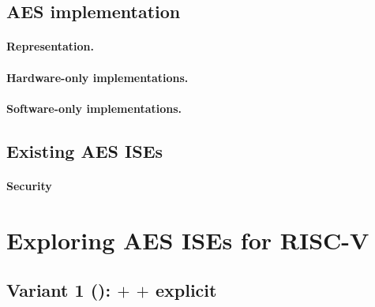 \documentclass[preprint]{iacrtrans}
\begin{document}
\subsection{AES implementation}
\label{sec:bg:aes_impl}

\paragraph{Representation.}
\label{sec:bg:aes_impl_rep}


\paragraph{Hardware-only implementations.}
\label{sec:bg:aes_impl_hw}

\paragraph{Software-only implementations.}
\label{sec:bg:aes_impl_sw}

\subsection{Existing AES ISEs}
\label{sec:bg:aes_impl_ise}


\paragraph{Security}
\label{sec:bg:aes_impl_sec}



\section{Exploring AES ISEs for RISC-V}
\label{sec:ise}


\label{sec:ise:design}



\subsection{Variant 1 ():  $+$  $+$ explicit }
\label{sec:ise:design:v1}

\end{document}
